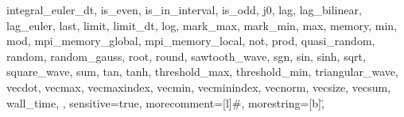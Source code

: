 {{      integral_euler_dt,
      is_even,
      is_in_interval,
      is_odd,
      j0,
      lag,
      lag_bilinear,
      lag_euler,
      last,
      limit,
      limit_dt,
      log,
      mark_max,
      mark_min,
      max,
      memory,
      min,
      mod,
      mpi_memory_global,
      mpi_memory_local,
      not,
      prod,
      quasi_random,
      random,
      random_gauss,
      root,
      round,
      sawtooth_wave,
      sgn,
      sin,
      sinh,
      sqrt,
      square_wave,
      sum,
      tan,
      tanh,
      threshold_max,
      threshold_min,
      triangular_wave,
      vecdot,
      vecmax,
      vecmaxindex,
      vecmin,
      vecminindex,
      vecnorm,
      vecsize,
      vecsum,
      wall_time,
},
sensitive=true,
morecomment=[l]{\#},
morestring=[b]\",
}
